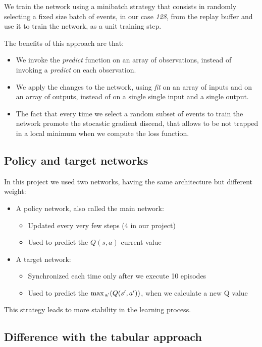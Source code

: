 \documentclass{article}
\begin{document}
We train the network using a minibatch strategy that consists
in randomly selecting a fixed size batch of events,
in our case \emph{128}, from the replay buffer and use it to train the network,
as a unit training step.

The benefits of this approach are that:

\begin{itemize}
  \item We invoke the \emph{predict} function on an array of observations, instead of invoking a \emph{predict} on each observation.
  \item We apply the changes to the network, using \emph{fit} on an array of inputs and on an array of outputs, 
  instead of on a single single input and a single output.
  \item The fact that every time we select a random subset of events 
  to train the network promote the stocastic gradient discend, that allows
  to be not trapped in a local minimum when we compute the loss function.
\end{itemize}

\subsection{Policy and target networks}

In this project we used two networks, having the same architecture but different weight:

\begin{itemize}
  \item A policy network, also called the main network:
  \begin{itemize}
    \item{Updated every very few steps (4 in our project)}
    \item {Used to predict the $Q(s,a)$ current value}
  \end{itemize}   
  \item A target network:
  \begin{itemize}
    \item{Synchronized each time only after we execute 10 episodes}
    \item{Used to predict the $\max\textsubscript{a'} (Q(s',a'))$, when we calculate a new Q value}
  \end{itemize} 
\end{itemize}

This strategy leads to more stability in the learning process.

\subsection{Difference with the tabular approach}
\end{document}
